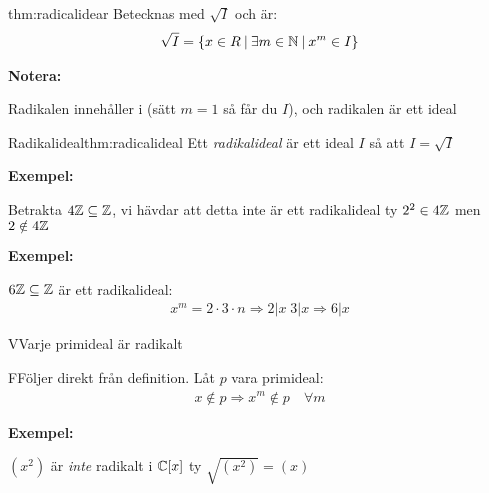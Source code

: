 \begin{theo}{thm:radicalidear}
  Betecknas med $\sqrt{I}$ och är:
  \begin{equation*}
    \begin{gathered}
    \sqrt{I} = \left\{x\in R\:|\:\exists m\in\mathbb{N}\:|\: x^m\in I\right\}
    \end{gathered}
  \end{equation*}
\end{theo}
\par\bigskip
\noindent\textbf{Notera:}\par
\noindent Radikalen innehåller i (sätt $m=1$ så får du $I$), och radikalen är ett ideal
\par\bigskip
\begin{theo}{Radikalideal}{thm:radicalideal}
  Ett \textit{radikalideal} är ett ideal $I$ så att $I = \sqrt{I}$
\end{theo}
\par\bigskip
\noindent\textbf{Exempel:}\par
\noindent Betrakta $4\mathbb{Z}\subseteq\mathbb{Z}$, vi hävdar att detta inte är ett radikalideal ty $2^2\in4\mathbb{Z}$ men $2\notin4\mathbb{Z}$
\par\bigskip
\noindent\textbf{Exempel:}\par
\noindent $6\mathbb{Z}\subseteq\mathbb{Z}$ är ett radikalideal:
\begin{equation*}
  \begin{gathered}
    x^m = 2\cdot3\cdot n\Rightarrow 2|x\;3|x\Rightarrow 6|x
  \end{gathered}
\end{equation*}
\par\bigskip
\begin{theo}
  VVarje primideal är radikalt
\end{theo}
\par\bigskip
\begin{prf}
  FFöljer direkt från definition. Låt $p$ vara primideal:
  \begin{equation*}
    \begin{gathered}
      x\notin p\Rightarrow x^m\notin p\quad\forall m
    \end{gathered}
  \end{equation*}
\end{prf}
\par\bigskip
\noindent\textbf{Exempel:}\par
\noindent $(x^2)$ är \textit{inte} radikalt i $\mathbb{C}[x]$ ty $\sqrt{(x^2)} = (x)$
\par\bigskip
